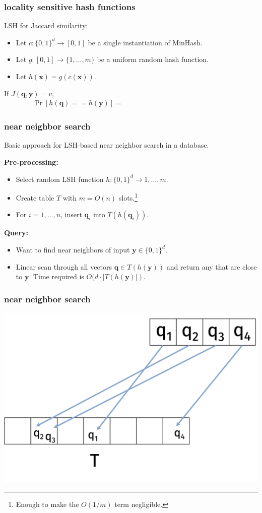 \documentclass[compress]{beamer}
\newcommand{\bv}[1]{\mathbf{#1}}
\begin{document}
\begin{frame}
	\frametitle{locality sensitive hash functions}
	LSH for Jaccard similarity:
	\begin{itemize}
		\item Let $c: \{0,1\}^d \rightarrow [0,1]$ be a single instantiation of MinHash.
		\item Let $g: [0,1] \rightarrow \{1, \ldots, m\}$ be a uniform random hash function.
		\item Let $h(\bv{x}) = g(c(\bv{x})).$
	\end{itemize}
		If $J(\bv{q},\bv{y}) = v$, 
		\begin{align*}
			\Pr\left[h(\bv{q}) == h(\bv{y})\right] = \hspace{15em}
		\end{align*}
\end{frame}

\begin{frame}
	\frametitle{near neighbor search}
	\begin{center}
	Basic approach for LSH-based near neighbor search in a database.
	\end{center}
		\textbf{Pre-processing:}
	\begin{itemize}
		\item Select random LSH function $h: \{0,1\}^d \rightarrow 1,\ldots, m$.
		\item Create table $T$ with $m = O(n)$ slots.\footnote{Enough to make the $O(1/m)$ term negligible.}
		\item For $i = 1,\ldots, n$, insert $\bv{q}_i$ into $T(h(\bv{q}_i))$.
	\end{itemize}
	\textbf{Query:}
	\begin{itemize}
		\item Want to find near neighbors of input $\bv{y}\in\{0,1\}^d$.
		\item Linear scan through all vectors $\bv{q}\in T(h(\bv{y}))$ and return any that are close to $\bv{y}$. Time required is $O(d\cdot |T(h(\bv{y})|)$.
	\end{itemize}
\vspace{1em}
\end{frame}

\begin{frame}
	\frametitle{near neighbor search}
	\begin{center}
		\includegraphics[width=.8\textwidth]{basicScheme.png}
	\end{center}
\end{frame}
\end{document}
